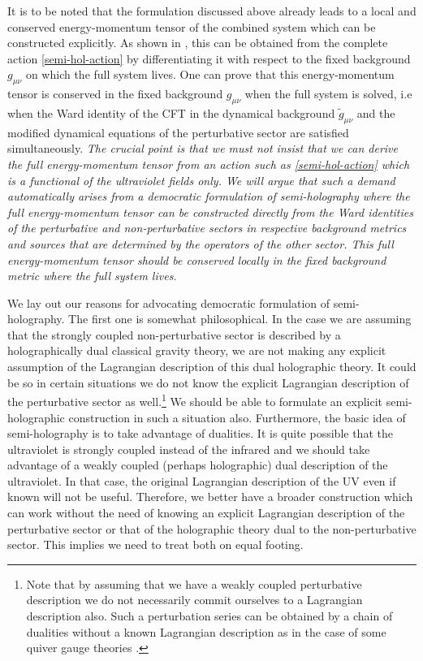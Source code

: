 \documentclass[prd,reprint,a4paper,showpacs,superscriptaddress,11pt,onecolumn,nofootinbib]{revtex4-1}
\renewcommand{\(}{\left(}
\renewcommand{\)}{\right)}
\newcommand{\6}{\partial}
\begin{document}
It is to be noted that the formulation discussed above already leads to a local and conserved energy-momentum tensor of the combined system which can be constructed explicitly. As shown in \cite{Mukhopadhyay:2015smb}, this can be obtained from the complete action \eqref{semi-hol-action} by differentiating it with respect to the fixed background $g_{\mu\nu}$ on which the full system lives. One can prove that this energy-momentum tensor is conserved in the fixed background $g_{\mu\nu}$ when the full system is solved, i.e when the Ward identity of the CFT in the dynamical background $\tilde{g}_{\mu\nu}$ and the modified dynamical equations of the perturbative sector are satisfied simultaneously. \textit{The crucial point is that we must not insist that we can derive the full energy-momentum tensor from an action such as \eqref{semi-hol-action} which is a functional of the ultraviolet fields only. We will argue that such a demand automatically arises from a democratic formulation of semi-holography where the full energy-momentum tensor can be constructed directly from the Ward identities of the perturbative and non-perturbative sectors in respective background metrics and sources that are determined by the operators of the other sector. This full energy-momentum tensor should be conserved locally in the fixed background metric where the full system lives.}

We lay out our reasons for advocating democratic formulation of semi-holography. The first one is somewhat philosophical. In the case we are assuming that the strongly coupled non-perturbative sector is described by a holographically dual classical gravity theory, we are not making any explicit assumption of the Lagrangian description of this dual holographic theory. It could be so in certain situations we do not know the explicit Lagrangian description of the perturbative sector as well.\footnote{Note that by assuming that we have a weakly coupled perturbative description we do not necessarily commit ourselves to a Lagrangian description also. Such a perturbation series can be obtained by a chain of dualities without a known Lagrangian description as in the case of some quiver gauge theories \cite{Alday:2009aq}.} We should be able to formulate an explicit semi-holographic construction in such a situation also. Furthermore, the basic idea of semi-holography is to take advantage of dualities. It is quite possible that the ultraviolet is strongly coupled instead of the infrared and we should take advantage of a weakly coupled (perhaps holographic) dual description of the ultraviolet. In that case, the original Lagrangian description of the UV even if known will not be useful. Therefore, we better have a broader construction which can work without the need of knowing an explicit Lagrangian description of the perturbative sector or that of the holographic theory dual to the non-perturbative sector. This implies we need to treat both on equal footing.
\end{document}

